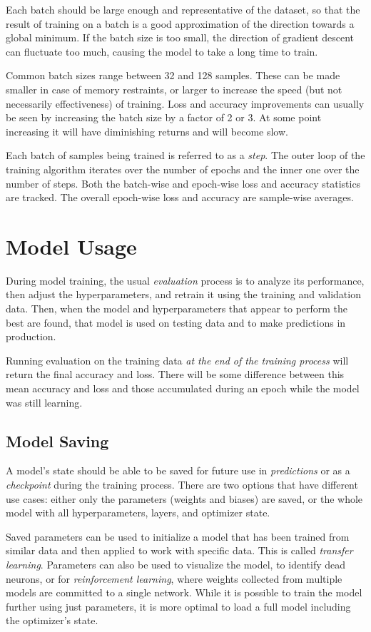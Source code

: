 \documentclass[a4paper]{article}
\begin{document}
Each batch should be large enough and representative of the dataset, so that the result of training on a batch is a good approximation of the direction towards a global minimum. If the batch size is too small, the direction of gradient descent can fluctuate too much, causing the model to take a long time to train. 

Common batch sizes range between 32 and 128 samples. These can be made smaller in case of memory restraints, or larger to increase the speed (but not necessarily effectiveness) of training. Loss and accuracy improvements can usually be seen by increasing the batch size by a factor of 2 or 3. At some point increasing it will have diminishing returns and will become slow. 

Each batch of samples being trained is referred to as a \emph{step}. The outer loop of the training algorithm iterates over the number of epochs and the inner one over the number of steps. Both the batch-wise and epoch-wise loss and accuracy statistics are tracked. The overall epoch-wise loss and accuracy are sample-wise averages.

\section*{Model Usage}
During model training, the usual \emph{evaluation} process is to analyze its performance, then adjust the hyperparameters, and retrain it using the training and validation data. Then, when the model and hyperparameters that appear to perform the best are found, that model is used on testing data and to make predictions in production. 

Running evaluation on the training data \textit{at the end of the training process} will return the final accuracy and loss. There will be some difference between this mean accuracy and loss and those accumulated during an epoch while the model was still learning.

\subsection*{Model Saving}
A model's state should be able to be saved for future use in \emph{predictions} or as a \emph{checkpoint} during the training process. There are two options that have different use cases: either only the parameters (weights and biases) are saved, or the whole model with all hyperparameters, layers, and optimizer state. 

Saved parameters can be used to initialize a model that has been trained from similar data and then applied to work with specific data. This is called \emph{transfer learning}. Parameters can also be used to visualize the model, to identify dead neurons, or for \emph{reinforcement learning}, where weights collected from multiple models are committed to a single network. While it is possible to train the model further using just parameters, it is more optimal to load a full model including the optimizer's state.
\end{document}
